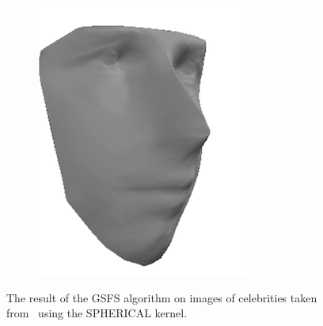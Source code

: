 \begin{figure}
\begin{subfigure}{0.23\textwidth}
        \includegraphics[width=\textwidth]{statistical_normals/images/gsfs_results/celebrities/tom_cruise_spherical.png}
\label{fig:tom-cruise-no-texture}
    \end{subfigure}
    \caption{The result of the GSFS algorithm on images of celebrities taken
             from~\cite{kemelmacher2011facereconstruction} using the SPHERICAL 
             kernel.}
\label{fig:celebrities}
\end{figure}

